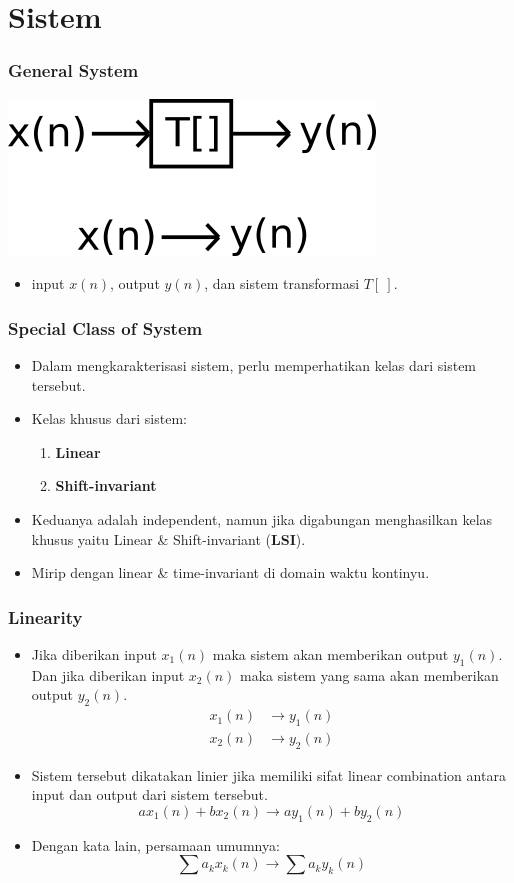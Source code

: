 \documentclass[pdflatex,compress]{beamer}
\begin{document}
\section{Sistem}

\begin{frame}
	\frametitle{General System}
	\begin{center}
		\includegraphics[width=0.5\linewidth]{img/img013}
	\end{center}
	\begin{itemize}
		\item input $ x(n) $, output $ y(n) $, dan sistem transformasi $ T[~] $.
	\end{itemize}
\end{frame}

\begin{frame}
	\frametitle{Special Class of System}
	\begin{itemize}
		\item Dalam mengkarakterisasi sistem, perlu memperhatikan kelas dari sistem tersebut.
		\item Kelas khusus dari sistem: 
		\begin{enumerate}
			\item \textbf{Linear}
			\item \textbf{Shift-invariant}
		\end{enumerate}
		\item Keduanya adalah independent, namun jika digabungan menghasilkan kelas khusus yaitu Linear \& Shift-invariant (\textbf{LSI}).
		\item Mirip dengan linear \& time-invariant di domain waktu kontinyu.
	\end{itemize}
\end{frame}

\begin{frame}
	\frametitle{Linearity}
	\begin{itemize}
		\item Jika diberikan input $ x_1(n) $ maka sistem akan memberikan output $ y_1(n) $. Dan jika diberikan input $ x_2(n) $ maka sistem yang sama akan memberikan output $ y_2(n) $.
		\begin{align*}
			x_1(n) &\rightarrow y_1(n) \\
			x_2(n) &\rightarrow y_2(n)
		\end{align*}
		\item Sistem tersebut dikatakan linier jika memiliki sifat linear combination antara input dan output dari sistem tersebut.
		\[ ax_1(n) + bx_2(n) \rightarrow ay_1(n) + by_2(n)\]
		\item Dengan kata lain, persamaan umumnya:
		\[ \sum a_k x_k(n) \rightarrow \sum a_k y_k(n) \]
	\end{itemize}
\end{frame}
\end{document}
